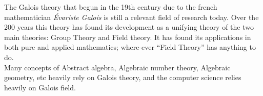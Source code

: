 The Galois theory that begun in the 19th century due to the french mathematician \textit{Évariste Galois} is still a relevant field of research today. Over the 200 years this theory has found its development as a unifying theory of the two main theories: Group Theory and Field theory. It has found its applications in both pure and applied mathematics; where-ever ``Field Theory'' has anything to do.\\
Many concepts of Abstract algebra, Algebraic number theory, Algebraic geometry, etc heavily rely on Galois theory, and the computer science relies heavily on Galois field.